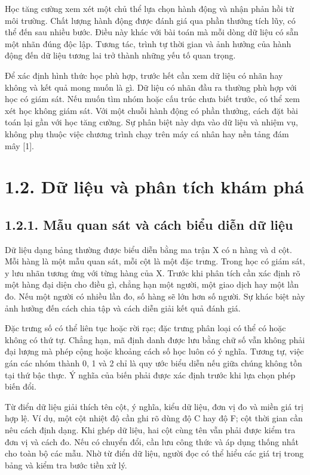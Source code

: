 Học tăng cường xem xét một chủ thể lựa chọn hành động và nhận phản hồi từ môi trường. Chất lượng hành động được đánh giá qua phần thưởng tích lũy, có thể đến sau nhiều bước. Điều này khác với bài toán mà mỗi dòng dữ liệu có sẵn một nhãn đúng độc lập. Tương tác, trình tự thời gian và ảnh hưởng của hành động đến dữ liệu tương lai trở thành những yếu tố quan trọng.


Để xác định hình thức học phù hợp, trước hết cần xem dữ liệu có nhãn hay không và kết quả mong muốn là gì. Dữ liệu có nhãn đầu ra thường phù hợp với học có giám sát. Nếu muốn tìm nhóm hoặc cấu trúc chưa biết trước, có thể xem xét học không giám sát. Với một chuỗi hành động có phần thưởng, cách đặt bài toán lại gần với học tăng cường. Sự phân biệt này dựa vào dữ liệu và nhiệm vụ, không phụ thuộc việc chương trình chạy trên máy cá nhân hay nền tảng đám mây [1].


\section{1.2. Dữ liệu và phân tích khám phá}

\subsection{1.2.1. Mẫu quan sát và cách biểu diễn dữ liệu}

Dữ liệu dạng bảng thường được biểu diễn bằng ma trận X có n hàng và d cột. Mỗi hàng là một mẫu quan sát, mỗi cột là một đặc trưng. Trong học có giám sát, y lưu nhãn tương ứng với từng hàng của X. Trước khi phân tích cần xác định rõ một hàng đại diện cho điều gì, chẳng hạn một người, một giao dịch hay một lần đo. Nếu một người có nhiều lần đo, số hàng sẽ lớn hơn số người. Sự khác biệt này ảnh hưởng đến cách chia tập và cách diễn giải kết quả đánh giá.


Đặc trưng số có thể liên tục hoặc rời rạc; đặc trưng phân loại có thể có hoặc không có thứ tự. Chẳng hạn, mã định danh được lưu bằng chữ số vẫn không phải đại lượng mà phép cộng hoặc khoảng cách số học luôn có ý nghĩa. Tương tự, việc gán các nhóm thành 0, 1 và 2 chỉ là quy ước biểu diễn nếu giữa chúng không tồn tại thứ bậc thực. Ý nghĩa của biến phải được xác định trước khi lựa chọn phép biến đổi.


Từ điển dữ liệu giải thích tên cột, ý nghĩa, kiểu dữ liệu, đơn vị đo và miền giá trị hợp lệ. Ví dụ, một cột nhiệt độ cần ghi rõ dùng độ C hay độ F; cột thời gian cần nêu cách định dạng. Khi ghép dữ liệu, hai cột cùng tên vẫn phải được kiểm tra đơn vị và cách đo. Nếu có chuyển đổi, cần lưu công thức và áp dụng thống nhất cho toàn bộ các mẫu. Nhờ từ điển dữ liệu, người đọc có thể hiểu các giá trị trong bảng và kiểm tra bước tiền xử lý.


